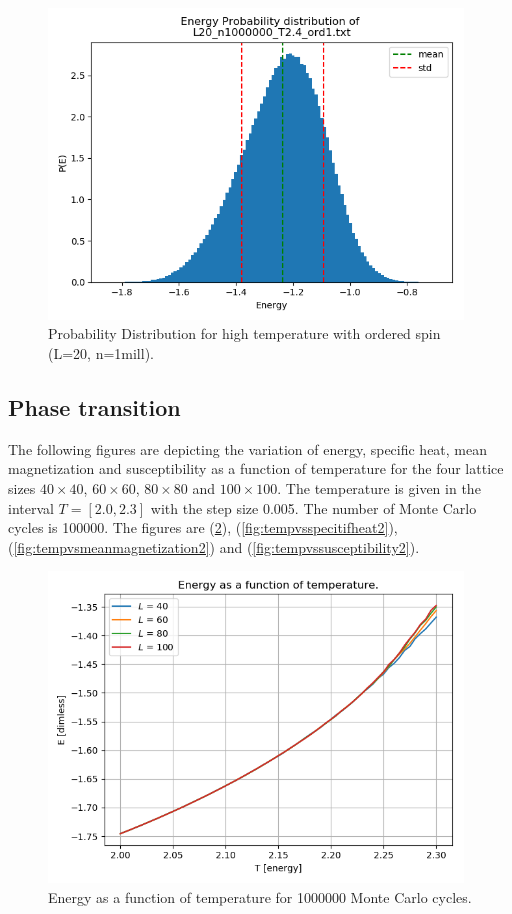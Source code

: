 \documentclass{article}
\begin{document}
  \begin{figure}[ht]
      \centering
      \includegraphics[width = 11cm]{img/energyhistogram_L20_n1000000_T24_ord1.png}
      \caption{Probability Distribution for high temperature with ordered spin (L=20, n=1mill).}
      \label{fig:prob-highT-ord1}
    \end{figure}


\subsection{Phase transition} \label{sec:phasetransition}

The following figures are depicting the variation of energy, specific heat, mean magnetization and susceptibility as a function of temperature for the four lattice sizes $40 \times 40$, $60 \times 60$, $80 \times 80$ and $100 \times 100$. The temperature is given in the interval $T = [2.0 , 2.3]$ with the step size 0.005. The number of Monte Carlo cycles is 100000. The figures are
(\ref{fig:tempvsenergy2}), (\ref{fig:tempvsspecitifheat2}), (\ref{fig:tempvsmeanmagnetization2}) and (\ref{fig:tempvssusceptibility2}).


  \begin{figure}[ht]
      \centering
      \includegraphics[width = 11cm]{img/tempvsenergy2.png}
      \caption{Energy as a function of temperature for 1000000 Monte Carlo cycles.}
      \label{fig:tempvsenergy2}
    \end{figure}
\end{document}
